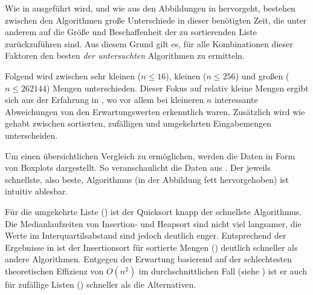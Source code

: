 Wie in  ausgeführt wird, und wie aus den Abbildungen in  hervorgeht, bestehen zwischen den Algorithmen große Unterschiede in dieser benötigten Zeit, die unter anderem auf die Größe und Beschaffenheit der zu sortierenden Liste zurückzuführen sind. Aus diesem Grund gilt es, für alle Kombinationen dieser Faktoren den besten \emph{der untersuchten} Algorithmen zu ermitteln.


Folgend wird zwischen sehr kleinen ($n \leq 16$), kleinen ($n \leq 256$) und großen ($n \leq 262144$) Mengen unterschieden. Dieser Fokus auf relativ kleine Mengen ergibt sich aus der Erfahrung in , wo vor allem bei kleineren $n$ interessante Abweichungen von den Erwartungswerten erkenntlich waren. Zusätzlich wird wie gehabt zwischen sortierten, zufälligen und umgekehrten Eingabemengen unterscheiden.



Um einen übersichtlichen Vergleich zu ermöglichen, werden die Daten in Form von Boxplots dargestellt. So veranschaulicht  die Daten aus . Der jeweils schnellste, also beste, Algorithmus (in der Abbildung fett hervorgehoben) ist intuitiv ablesbar.

Für die umgekehrte Liste () ist der Quicksort knapp der schnellste Algorithmus. Die Medianlaufzeiten von Insertion- und Heapsort sind nicht viel langsamer, die Werte im Interquartilsabstand sind jedoch deutlich enger. Entsprechend der Ergebnisse in  ist der Insertionsort für sortierte Mengen () deutlich schneller als andere Algorithmen. Entgegen der Erwartung basierend auf der schlechtesten theoretischen Effizienz von $O(n^2)$ im durchschnittlichen Fall (siehe ) ist er auch für zufällige Listen () schneller als die Alternativen.

